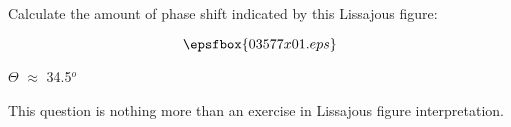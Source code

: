 

Calculate the amount of phase shift indicated by this Lissajous figure:

$$\epsfbox{03577x01.eps}$$







$\Theta$ $\approx$ 34.5$^{o}$







This question is nothing more than an exercise in Lissajous figure interpretation.




